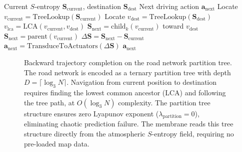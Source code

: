 \documentclass[12pt]{article}
\theoremstyle{definition}
\theoremstyle{remark}
\begin{document}
\begin{algorithm}[H]
\caption{Backward Trajectory Completion Navigation}
\label{alg:navigation}
\begin{algorithmic}[1]
\REQUIRE Current $S$-entropy $\mathbf{S}_{\mathrm{current}}$, destination $\mathbf{S}_{\mathrm{dest}}$
\ENSURE Next driving action $\mathbf{a}_{\mathrm{next}}$
\STATE Locate $v_{\mathrm{current}} = \mathrm{TreeLookup}(\mathbf{S}_{\mathrm{current}})$
\STATE Locate $v_{\mathrm{dest}} = \mathrm{TreeLookup}(\mathbf{S}_{\mathrm{dest}})$
\STATE $v_{\mathrm{lca}} = \mathrm{LCA}(v_{\mathrm{current}}, v_{\mathrm{dest}})$  
  \STATE $\mathbf{S}_{\mathrm{next}} = \mathrm{child}_k(v_{\mathrm{current}})$ toward $v_{\mathrm{dest}}$
\ELSE
  \STATE $\mathbf{S}_{\mathrm{next}} = \mathrm{parent}(v_{\mathrm{current}})$  
\ENDIF
\STATE $\Delta\mathbf{S} = \mathbf{S}_{\mathrm{next}} - \mathbf{S}_{\mathrm{current}}$
\STATE $\mathbf{a}_{\mathrm{next}} = \mathrm{TransduceToActuators}(\Delta\mathbf{S})$
\RETURN $\mathbf{a}_{\mathrm{next}}$
\end{algorithmic}
\end{algorithm}

\begin{figure}[H]
\centering
{}
\caption{Backward trajectory completion on the road network partition tree. The road network is encoded as a ternary partition tree with depth $D = \lceil\log_3 N\rceil$. Navigation from current position to destination requires finding the lowest common ancestor (LCA) and following the tree path, at $O(\log_3 N)$ complexity. The partition tree structure ensures zero Lyapunov exponent ($\lambda_{\mathrm{partition}} = 0$), eliminating chaotic prediction failure. The membrane reads this tree structure directly from the atmospheric $S$-entropy field, requiring no pre-loaded map data.}
\label{fig:backward_trajectory}
\end{figure}
\end{document}
